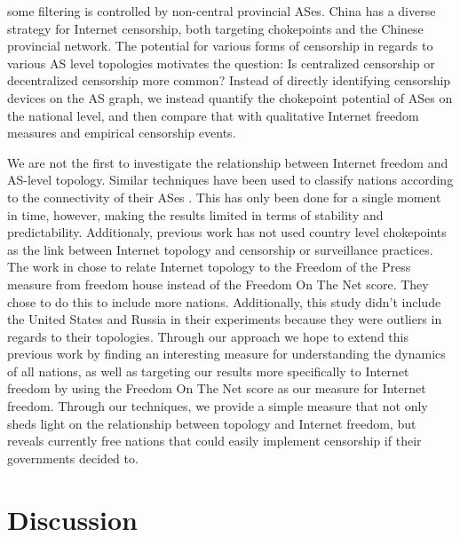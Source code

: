 \documentclass{article}
\begin{document}
\begin{multicols}{2}
some filtering is controlled by non-central provincial ASes. China has a
diverse strategy for Internet censorship, both targeting chokepoints and the
Chinese provincial network. The potential for various forms of censorship in
regards to various AS level topologies motivates the question: Is centralized
censorship or decentralized censorship more common? Instead of directly
identifying censorship devices on the AS graph, we instead quantify the
chokepoint potential of ASes on the national level, and then compare that with
qualitative Internet freedom measures and empirical censorship events.
\par
We are not the first to investigate the relationship between Internet freedom and
AS-level topology. Similar techniques have been used to classify nations according
to the connectivity of their ASes \cite{politicsrouting}. This has only been done for a
single moment in time, however, making the results limited in terms of stability and predictability.
Additionaly, previous work has not used country level chokepoints as the link between Internet topology
and censorship or surveillance practices. The work in \cite{politicsrouting} chose to relate Internet topology
to the Freedom of the Press measure from freedom house instead of the Freedom On The Net score. They chose to do this
to include more nations. Additionally, this study didn't include the United States and Russia in their experiments because they were
outliers in regards to their topologies. Through our approach we hope to extend this previous work by finding an interesting measure for
understanding the dynamics of all nations, as well as targeting our results more specifically to Internet freedom by using the Freedom On
The Net score as our measure for Internet freedom. Through our techniques, we provide a simple measure that not only 
sheds light on the relationship between topology and Internet freedom, but reveals currently free
nations that could easily implement censorship if their governments decided to.


\section{Discussion}


\end{multicols}
\end{document}
